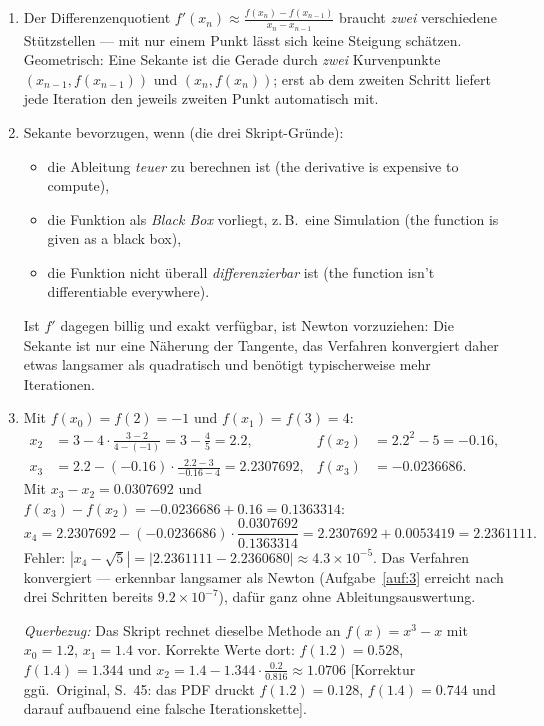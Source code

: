 \documentclass[a4paper,11pt]{scrartcl}
\begin{document}
\begin{enumerate}[label=(\alph*)]
  \item Der Differenzenquotient
  $f'(x_n) \approx \frac{f(x_n) - f(x_{n-1})}{x_n - x_{n-1}}$ braucht \emph{zwei}
  verschiedene Stützstellen --- mit nur einem Punkt lässt sich keine Steigung schätzen.
  Geometrisch: Eine Sekante ist die Gerade durch \emph{zwei} Kurvenpunkte
  $(x_{n-1}, f(x_{n-1}))$ und $(x_n, f(x_n))$; erst ab dem zweiten Schritt liefert
  jede Iteration den jeweils zweiten Punkt automatisch mit.
  \item Sekante bevorzugen, wenn (die drei Skript-Gründe):
  \begin{itemize}[nosep]
    \item die Ableitung \emph{teuer} zu berechnen ist (the derivative is expensive to
    compute),
    \item die Funktion als \emph{Black Box} vorliegt, z.\,B.\ eine Simulation (the
    function is given as a black box),
    \item die Funktion nicht überall \emph{differenzierbar} ist (the function isn't
    differentiable everywhere).
  \end{itemize}
  Ist $f'$ dagegen billig und exakt verfügbar, ist Newton vorzuziehen: Die Sekante ist
  nur eine Näherung der Tangente, das Verfahren konvergiert daher etwas langsamer als
  quadratisch und benötigt typischerweise mehr Iterationen.
  \item Mit $f(x_0) = f(2) = -1$ und $f(x_1) = f(3) = 4$:
  \begin{align*}
    x_2 &= 3 - 4 \cdot \frac{3 - 2}{4 - (-1)} = 3 - \frac{4}{5} = 2.2,
        & f(x_2) &= 2.2^2 - 5 = -0.16,\\[2pt]
    x_3 &= 2.2 - (-0.16) \cdot \frac{2.2 - 3}{-0.16 - 4} = 2.2307692,
        & f(x_3) &= -0.0236686.
  \end{align*}
  Mit $x_3 - x_2 = 0.0307692$ und $f(x_3) - f(x_2) = -0.0236686 + 0.16 = 0.1363314$:
  \[ x_4 = 2.2307692 - (-0.0236686) \cdot \frac{0.0307692}{0.1363314}
         = 2.2307692 + 0.0053419 = 2.2361111. \]
  Fehler: $|x_4 - \sqrt{5}| = |2.2361111 - 2.2360680| \approx 4.3 \times 10^{-5}$.
  Das Verfahren konvergiert --- erkennbar langsamer als Newton (Aufgabe~\ref{auf:3}
  erreicht nach drei Schritten bereits $9.2 \times 10^{-7}$), dafür ganz ohne
  Ableitungsauswertung.

  \emph{Querbezug:} Das Skript rechnet dieselbe Methode an $f(x) = x^3 - x$ mit
  $x_0 = 1.2$, $x_1 = 1.4$ vor. Korrekte Werte dort: $f(1.2) = 0.528$,
  $f(1.4) = 1.344$ und $x_2 = 1.4 - 1.344 \cdot \frac{0.2}{0.816} \approx 1.0706$
  [Korrektur ggü.\ Original, S.~45: das PDF druckt $f(1.2) = 0.128$, $f(1.4) = 0.744$
  und darauf aufbauend eine falsche Iterationskette].
\end{enumerate}
\end{document}

